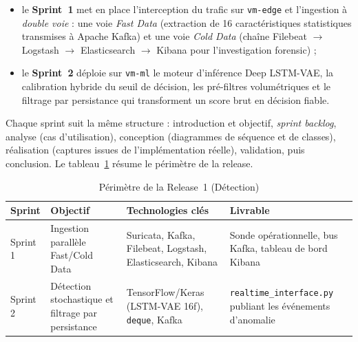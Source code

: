 \begin{itemize}
  \item le \textbf{Sprint~1} met en place l'interception du trafic sur \texttt{vm-edge} et l'ingestion à \emph{double voie} : une voie \emph{Fast Data} (extraction de 16 caractéristiques statistiques transmises à Apache Kafka) et une voie \emph{Cold Data} (chaîne Filebeat $\rightarrow$ Logstash $\rightarrow$ Elasticsearch $\rightarrow$ Kibana pour l'investigation forensic) ;
  \item le \textbf{Sprint~2} déploie sur \texttt{vm-ml} le moteur d'inférence Deep LSTM-VAE, la calibration hybride du seuil de décision, les pré-filtres volumétriques et le filtrage par persistance qui transforment un score brut en décision fiable.
\end{itemize}

Chaque sprint suit la même structure : introduction et objectif, \emph{sprint backlog}, analyse (cas d'utilisation), conception (diagrammes de séquence et de classes), réalisation (captures issues de l'implémentation réelle), validation, puis conclusion. Le tableau~\ref{tab:r1-synthese} résume le périmètre de la release.

\begin{table}[H]
\centering
\caption{Périmètre de la Release~1 (Détection)}
\label{tab:r1-synthese}
\small
\begin{tabularx}{\textwidth}{@{}l>{\raggedright\arraybackslash}X>{\raggedright\arraybackslash}X>{\raggedright\arraybackslash}X@{}}
\toprule
\textbf{Sprint} & \textbf{Objectif} & \textbf{Technologies clés} & \textbf{Livrable} \\
\midrule
Sprint 1 & Ingestion parallèle Fast/Cold Data & Suricata, Kafka, Filebeat, Logstash, Elasticsearch, Kibana & Sonde opérationnelle, bus Kafka, tableau de bord Kibana \\
Sprint 2 & Détection stochastique et filtrage par persistance & TensorFlow/Keras (LSTM-VAE 16f), \texttt{deque}, Kafka & \texttt{realtime\_interface.py} publiant les événements d'anomalie \\
\bottomrule
\end{tabularx}
\end{table}


